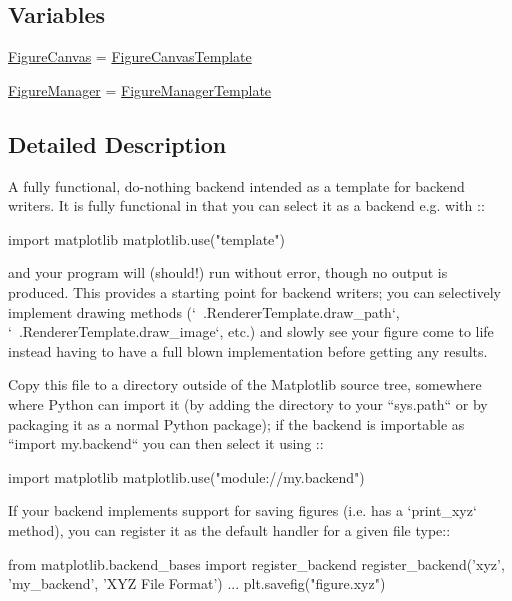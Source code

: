\subsection*{Variables}
\begin{DoxyCompactItemize}
\item 
\hyperlink{namespacematplotlib_1_1backends_1_1backend__template_af766f50365e7bb5944cc0b140e3b3200}{Figure\+Canvas} = \hyperlink{classmatplotlib_1_1backends_1_1backend__template_1_1FigureCanvasTemplate}{Figure\+Canvas\+Template}
\item 
\hyperlink{namespacematplotlib_1_1backends_1_1backend__template_a44c2f2ee4fb04bd94b280dfaa2f76cec}{Figure\+Manager} = \hyperlink{classmatplotlib_1_1backends_1_1backend__template_1_1FigureManagerTemplate}{Figure\+Manager\+Template}
\end{DoxyCompactItemize}


\subsection{Detailed Description}
\begin{DoxyVerb}A fully functional, do-nothing backend intended as a template for backend
writers.  It is fully functional in that you can select it as a backend e.g.
with ::

    import matplotlib
    matplotlib.use("template")

and your program will (should!) run without error, though no output is
produced.  This provides a starting point for backend writers; you can
selectively implement drawing methods (`~.RendererTemplate.draw_path`,
`~.RendererTemplate.draw_image`, etc.) and slowly see your figure come to life
instead having to have a full blown implementation before getting any results.

Copy this file to a directory outside of the Matplotlib source tree, somewhere
where Python can import it (by adding the directory to your ``sys.path`` or by
packaging it as a normal Python package); if the backend is importable as
``import my.backend`` you can then select it using ::

    import matplotlib
    matplotlib.use("module://my.backend")

If your backend implements support for saving figures (i.e. has a `print_xyz`
method), you can register it as the default handler for a given file type::

    from matplotlib.backend_bases import register_backend
    register_backend('xyz', 'my_backend', 'XYZ File Format')
    ...
    plt.savefig("figure.xyz")
\end{DoxyVerb}
 

